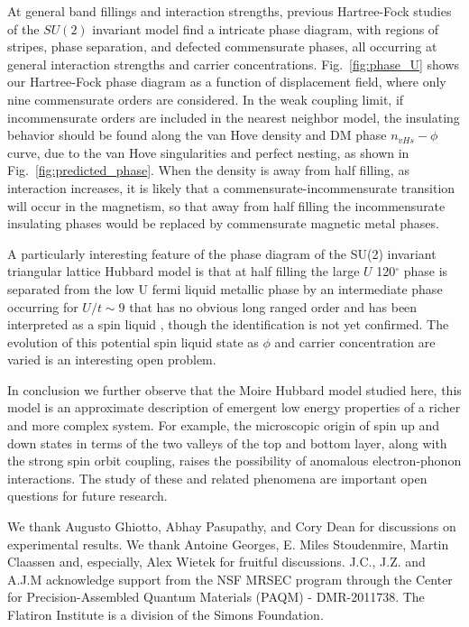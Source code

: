 \documentclass[%
reprint,
superscriptaddress,
twocolumn,
 amsmath,amssymb,
 aps,
 prb,
]{revtex4-2}
\begin{document}
At general band fillings and interaction strengths, previous Hartree-Fock studies of the $SU(2)$ invariant model find a intricate phase diagram, with regions of stripes, phase separation, and defected commensurate phases, all occurring at general interaction strengths and carrier concentrations. Fig.~\ref{fig:phase_U} shows our Hartree-Fock phase diagram as a function of displacement field, where only nine commensurate orders are considered. In the weak coupling limit, if incommensurate orders are included in the nearest neighbor model, the insulating behavior should be found along the van Hove density and DM phase $n_{vHs}-\phi$ curve, due to the van Hove singularities and perfect nesting, as shown in Fig.~\ref{fig:predicted_phase}. When the density is away from half filling, as interaction increases, it is likely that a commensurate-incommensurate transition will occur in the magnetism, so that away from half filling  the incommensurate insulating phases would be replaced by commensurate magnetic metal phases.

A particularly interesting feature of the phase diagram of the SU(2) invariant triangular lattice Hubbard model is that at half filling the large $U$ 120$^\circ$ phase is separated from the low U fermi liquid metallic phase by an intermediate phase occurring for $U/t\sim9$ that has no obvious long ranged order and has been interpreted as a spin liquid \cite{PhysRevB.96.205130}, though the identification is not yet confirmed. The evolution of this potential  spin liquid state as $\phi$ and carrier concentration are varied is an interesting open problem.

In conclusion we further observe that the Moire Hubbard model studied here, this model is an approximate description of  emergent low energy properties of a richer and more complex system. For example, the microscopic origin of spin up and down states in terms of the two valleys of the top and bottom layer, along with the strong spin orbit coupling,  raises the possibility of anomalous  electron-phonon interactions. The study of these and related phenomena are important open questions for future research. 

\begin{acknowledgments}
We thank Augusto Ghiotto, Abhay Pasupathy, and Cory Dean for discussions on experimental results. We thank Antoine Georges, E. Miles Stoudenmire, Martin Claassen and, especially, Alex Wietek for fruitful discussions. J.C., J.Z. and A.J.M acknowledge support from the NSF MRSEC program through the Center for Precision-Assembled Quantum Materials (PAQM) - DMR-2011738. The Flatiron Institute is a division of the Simons Foundation.
\end{acknowledgments}
\end{document}
